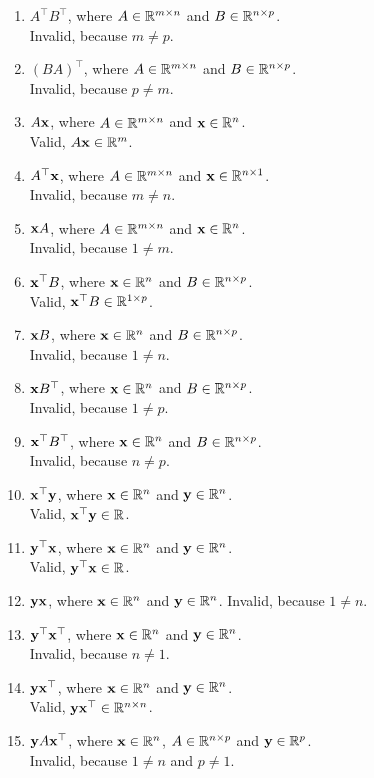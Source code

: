 \documentclass[twocolumn]{article}
\begin{document}
\begin{enumerate}
  \item $A^\top B^\top$, where $A \in \mathbb{R}^{m \times n}$ and $B \in \mathbb{R}^{n
      \times p}$.
    \\
    Invalid, because $m \ne p$.
  \item $(BA)^\top$, where $A \in \mathbb{R}^{m \times n}$ and $B \in \mathbb{R}^{n \times p}$.
    \\
    Invalid, because $p \ne m$.
  \item $A\mathbf{x}$, where $A \in \mathbb{R}^{m \times n}$ and $\mathbf{x} \in \mathbb{R}^{n}$.
    \\
    Valid, $A\mathbf{x} \in \mathbb{R}^{m}$. 
  \item $A^\top\mathbf{x}$, where $A \in \mathbb{R}^{m \times n}$ and $\mathbf{x} \in \mathbb{R}^{n
      \times 1}$.
    \\
    Invalid, because $m \ne n$.
  \item $\mathbf{x} A$, where $A \in \mathbb{R}^{m \times n}$ and $\mathbf{x} \in \mathbb{R}^{n}$.
    \\
    Invalid, because $1 \ne m$.
  \item $\mathbf{x}^\top B$, where $\mathbf{x} \in \mathbb{R}^{n}$ and $B \in \mathbb{R}^{n \times p}$.
    \\
    Valid, $\mathbf{x}^\top B \in \mathbb{R}^{1 \times p}$.
  \item $\mathbf{x} B$, where $\mathbf{x} \in \mathbb{R}^{n}$ and $B \in \mathbb{R}^{n \times p}$.
    \\
    Invalid, because $1 \ne n$.
  \item $\mathbf{x} B^\top$, where $\mathbf{x} \in \mathbb{R}^{n}$ and $B \in \mathbb{R}^{n \times p}$.
    \\
    Invalid, because $1 \ne p$.
  \item $\mathbf{x}^\top B^\top$, where $\mathbf{x} \in \mathbb{R}^{n}$ and $B \in \mathbb{R}^{n \times p}$.
    \\
    Invalid, because $n \ne p$.
  \item $\mathbf{x}^\top \mathbf{y}$, where $\mathbf{x} \in \mathbb{R}^{n}$ and $\mathbf{y} \in \mathbb{R}^{n}$.
    \\
    Valid, $\mathbf{x}^\top \mathbf{y} \in \mathbb{R}$.
  \item $\mathbf{y}^\top \mathbf{x}$, where $\mathbf{x} \in \mathbb{R}^{n}$ and $\mathbf{y} \in \mathbb{R}^{n}$.
    \\
    Valid, $\mathbf{y}^\top \mathbf{x} \in \mathbb{R}$.
  \item $\mathbf{y} \mathbf{x}$, where $\mathbf{x} \in \mathbb{R}^{n}$ and $\mathbf{y} \in \mathbb{R}^{n}$.
    Invalid, because $1 \ne n$.
  \item $\mathbf{y}^\top \mathbf{x}^\top$, where $\mathbf{x} \in \mathbb{R}^{n}$ and $\mathbf{y} \in \mathbb{R}^{n}$.
    \\
    Invalid, because $n \ne 1$.
  \item $\mathbf{y} \mathbf{x}^\top$, where $\mathbf{x} \in \mathbb{R}^{n}$ and $\mathbf{y} \in \mathbb{R}^{n}$.
    \\
    Valid, $\mathbf{y} \mathbf{x}^\top \in \mathbb{R}^{n \times n}$.
  \item $\mathbf{y} A \mathbf{x}^\top$, where $\mathbf{x} \in \mathbb{R}^{n}$, $A \in \mathbb{R}^{n \times p}$ and $\mathbf{y} \in \mathbb{R}^{p}$.
    \\
    Invalid, because $1\ne n$ and $p\ne 1$.
    

\end{enumerate}
\end{document}
